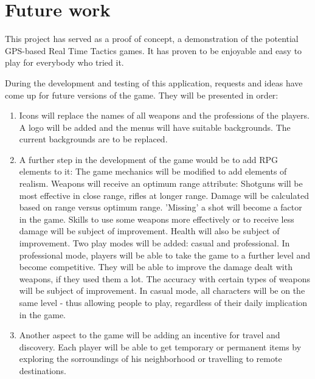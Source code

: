 
\section{Future work}


This project has served as a proof of concept, a demonstration of the
potential GPS-based Real Time Tactics games. It has proven to be enjoyable
and easy to play for everybody who tried it.\newline

During the development and testing of this application, requests and ideas have
come up for future versions of the game. They will be presented in
order:\newline
\begin{enumerate}
  \item Icons will replace the names of all weapons and the professions of the
  players. A logo will be added and the menus will have suitable backgrounds.
  The current backgrounds are to be replaced.
  
  \item A further step in the development of the game would be to add RPG
  elements to it: The game mechanics will be modified to add elements of
  realism. Weapons will receive an optimum range attribute: Shotguns will be
  most effective in close range, rifles at longer range. Damage will be
  calculated based on range versus optimum range. 'Missing' a shot will become a
  factor in the game. Skills to use some weapons more effectively or to receive
  less damage will be subject of improvement. Health will also be subject of
  improvement. Two play modes will be added: casual and professional. In
  professional mode, players will be able to take the game to a further level
  and become competitive. They will be able to improve the damage dealt with
  weapons, if they used them a lot. The accuracy with certain types of weapons
  will be subject of improvement. In casual mode, all characters will be on the
  same level - thus allowing people to play, regardless of their daily
  implication in the game.
  
  \item Another aspect to the game will be adding an incentive for travel and
  discovery. Each player will be able to get temporary or permanent items by
  exploring the sorroundings of his neighborhood or travelling to remote
  destinations.   
  

\end{enumerate}
